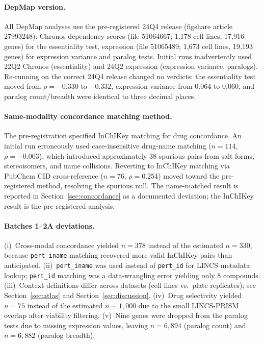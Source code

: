 \documentclass[11pt]{article}
\begin{document}
\paragraph{DepMap version.}
All DepMap analyses use the pre-registered 24Q4 release (figshare
article 27993248): Chronos dependency scores (file 51064667; 1{,}178
cell lines, 17{,}916 genes) for the essentiality test, expression
(file 51065489; 1{,}673 cell lines, 19{,}193 genes) for expression
variance and paralog tests.
Initial runs inadvertently used 22Q2 Chronos (essentiality) and 24Q2
expression (expression variance, paralogs).  Re-running on the correct 24Q4 release changed no
verdicts: the essentiality test moved from $\rho = -0.330$ to $-0.332$,
expression variance from $0.064$ to $0.060$, and paralog count/breadth
were identical to three decimal places.

\paragraph{Same-modality concordance matching method.}
The pre-registration specified InChIKey matching for drug concordance.
An initial run erroneously used case-insensitive drug-name matching
($n = 114$, $\rho = -0.003$), which introduced approximately 38
spurious pairs from salt forms, stereoisomers, and name collisions.
Reverting to InChIKey matching via PubChem CID cross-reference
($n = 76$, $\rho = 0.254$) moved toward the pre-registered method,
resolving the spurious null.  The name-matched result is reported in
Section~\ref{sec:concordance} as a documented deviation; the InChIKey
result is the pre-registered analysis.

\paragraph{Batches 1--2A deviations.}
(i)~Cross-modal concordance yielded $n = 378$ instead of the estimated $n = 330$, because
\texttt{pert\_iname} matching recovered more valid InChIKey pairs than
anticipated.
(ii)~\texttt{pert\_iname} was used instead of \texttt{pert\_id} for
LINCS metadata lookup; \texttt{pert\_id} matching was a data-wrangling
error yielding only 8 compounds.
(iii)~Context definitions differ across datasets (cell lines vs.\ plate
replicates); see Section~\ref{sec:atlas} and Section~\ref{sec:discussion}.
(iv)~Drug selectivity yielded $n = 75$ instead of the estimated $n \sim 1{,}000$ due
to the small LINCS-PRISM overlap after viability filtering.
(v)~Nine genes were dropped from the paralog tests due to missing
expression values, leaving $n = 6{,}894$ (paralog count) and
$n = 6{,}882$ (paralog breadth).
\end{document}
